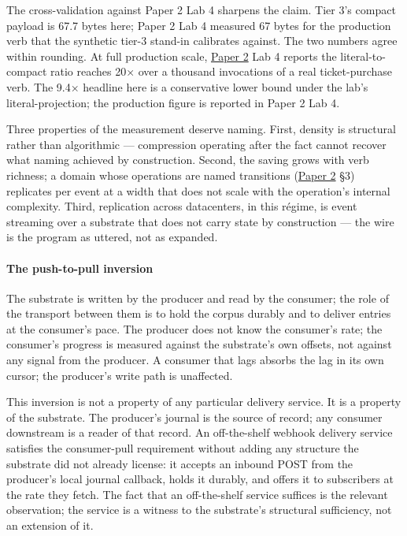 \documentclass[
]{article}
\begin{document}
The cross-validation against Paper 2 Lab 4 sharpens the claim. Tier 3's
compact payload is 67.7 bytes here; Paper 2 Lab 4 measured 67 bytes for
the production verb that the synthetic tier-3 stand-in calibrates
against. The two numbers agree within rounding. At full production
scale, \href{02-program-value-separability.md}{Paper 2} Lab 4 reports
the literal-to-compact ratio reaches 20× over a thousand invocations of
a real ticket-purchase verb. The 9.4× headline here is a conservative
lower bound under the lab's literal-projection; the production figure is
reported in Paper 2 Lab 4.

Three properties of the measurement deserve naming. First, density is
structural rather than algorithmic --- compression operating after the
fact cannot recover what naming achieved by construction. Second, the
saving grows with verb richness; a domain whose operations are named
transitions (\href{02-program-value-separability.md}{Paper 2} §3)
replicates per event at a width that does not scale with the operation's
internal complexity. Third, replication across datacenters, in this
régime, is event streaming over a substrate that does not carry state by
construction --- the wire is the program as uttered, not as expanded.

\paragraph{The push-to-pull inversion}\label{the-push-to-pull-inversion}

The substrate is written by the producer and read by the consumer; the
role of the transport between them is to hold the corpus durably and to
deliver entries at the consumer's pace. The producer does not know the
consumer's rate; the consumer's progress is measured against the
substrate's own offsets, not against any signal from the producer. A
consumer that lags absorbs the lag in its own cursor; the producer's
write path is unaffected.

This inversion is not a property of any particular delivery service. It
is a property of the substrate. The producer's journal is the source of
record; any consumer downstream is a reader of that record. An
off-the-shelf webhook delivery service satisfies the consumer-pull
requirement without adding any structure the substrate did not already
license: it accepts an inbound POST from the producer's local journal
callback, holds it durably, and offers it to subscribers at the rate
they fetch. The fact that an off-the-shelf service suffices is the
relevant observation; the service is a witness to the substrate's
structural sufficiency, not an extension of it.
\end{document}
